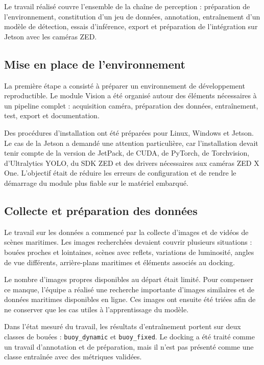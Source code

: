 \documentclass[11pt,letterpaper]{article}
\begin{document}
Le travail réalisé couvre l'ensemble de la chaîne de perception : préparation de l'environnement, constitution d'un jeu de données, annotation, entraînement d'un modèle de détection, essais d'inférence, export et préparation de l'intégration sur Jetson avec les caméras ZED.

\subsection{Mise en place de l'environnement}

La première étape a consisté à préparer un environnement de développement reproductible. Le module Vision a été organisé autour des éléments nécessaires à un pipeline complet : acquisition caméra, préparation des données, entraînement, test, export et documentation.

Des procédures d'installation ont été préparées pour Linux, Windows et Jetson. Le cas de la Jetson a demandé une attention particulière, car l'installation devait tenir compte de la version de JetPack, de CUDA, de PyTorch, de Torchvision, d'Ultralytics YOLO, du SDK ZED et des drivers nécessaires aux caméras ZED X One. L'objectif était de réduire les erreurs de configuration et de rendre le démarrage du module plus fiable sur le matériel embarqué.

\subsection{Collecte et préparation des données}

Le travail sur les données a commencé par la collecte d'images et de vidéos de scènes maritimes. Les images recherchées devaient couvrir plusieurs situations : bouées proches et lointaines, scènes avec reflets, variations de luminosité, angles de vue différents, arrière-plans maritimes et éléments associés au docking.

Le nombre d'images propres disponibles au départ était limité. Pour compenser ce manque, l'équipe a réalisé une recherche importante d'images similaires et de données maritimes disponibles en ligne. Ces images ont ensuite été triées afin de ne conserver que les cas utiles à l'apprentissage du modèle.

Dans l'état mesuré du travail, les résultats d'entraînement portent sur deux classes de bouées : \texttt{buoy\_dynamic} et \texttt{buoy\_fixed}. Le docking a été traité comme un travail d'annotation et de préparation, mais il n'est pas présenté comme une classe entraînée avec des métriques validées.
\end{document}
